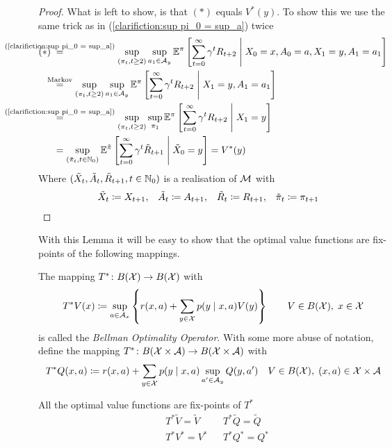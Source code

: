 \begin{proof}
	What is left to show, is that \((*)\) equals \(V^*(y)\). To show this we use the same trick as in (\ref{clarifiction:sup pi_0 = sup_a}) twice
	\begin{align*}
		(*)\; &\lxeq{\text{(\ref{clarifiction:sup pi_0 = sup_a})}}\sup_{(\pi_t,t\ge 2)}\sup_{a_1\in\cA_y}
		\E^\pi\left[\sum_{t=0}^\infty \gamma^t R_{t+2}
		\;\middle|\; X_0=x,A_0=a, X_1=y, A_1=a_1\right]
		\\
		&\lxeq{\text{Markov}}\sup_{(\pi_t,t\ge 2)}\sup_{a_1\in\cA_y}
		\E^\pi\left[\sum_{t=0}^\infty \gamma^t R_{t+2}\;\middle|\; X_1=y, A_1=a_1\right]
		\\
		&\lxeq{\text{(\ref{clarifiction:sup pi_0 = sup_a})}}
		\sup_{(\pi_t,t\ge 2)}\sup_{\pi_1}
		\E^\pi\left[\sum_{t=0}^\infty \gamma^t R_{t+2}\;\middle|\; X_1=y\right]
		\\
		&=\sup_{(\tilde{\pi}_t,t\in\N_0)}
		\E^{\tilde{\pi}}\left[\sum_{t=0}^\infty \gamma^t \tilde{R}_{t+1}
		\;\middle|\; \tilde{X}_0=y\right]=V^*(y)
	\end{align*}
	Where \((\tilde{X}_t,\tilde{A}_t,\tilde{R}_{t+1}, t\in\mathbb{N}_0) \) is a realisation of \(\mathcal{M}\) with
	\[
	\begin{aligned}
		&\tilde{X}_t\coloneqq X_{t+1}, && \tilde{A}_t\coloneqq A_{t+1},
		&&\tilde{R}_t\coloneqq R_{t+1},  && \tilde{\pi}_t\coloneqq \pi_{t+1} 
	\end{aligned} \qedhere
	\]
\end{proof}

With this Lemma it will be easy to show that the optimal value functions are fix-points of the following mappings. 

\begin{definition}
The mapping \(T^*\colon B(\mathcal{X})\to B(\mathcal{X})\) with
	\[
	 T^* V(x)\coloneqq \sup_{a\in\mathcal{A}_x}\left\{r(x,a)+\sum_{y\in\mathcal{X}}p(y\mid x,a) V(y)\right\} \qquad V\in B(\mathcal{X}),\; x\in\mathcal{X}
	\]
is called the \emph{Bellman Optimality Operator}. With some more abuse of notation, define the mapping \(T^*\colon B(\mathcal{X}\times\mathcal{A})\to B(\mathcal{X}\times\mathcal{A})\) with
	\[
	T^* Q(x,a)\coloneqq r(x,a)+\sum_{y\in\mathcal{X}}p(y\mid x,a) \sup_{a'\in\mathcal{A}_y}Q(y,a') 
	\quad V\in B(\mathcal{X}),\; (x,a)\in\mathcal{X}\times\mathcal{A}
	\]
\end{definition}


\begin{corollary} All the optimal value functions are fix-points of \(T^*\)
	\begin{align*}
	&T^*\tilde{V}=\tilde{V}  && T^*\tilde{Q}=\tilde{Q}\\
	&T^*V^*=V^* && T^*Q^*=Q^*
	\end{align*}
\end{corollary}

